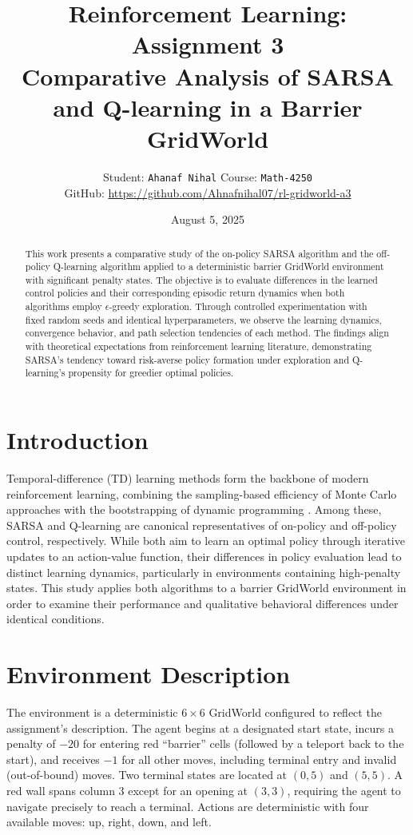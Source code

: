 \documentclass[11pt]{article}
\title{Reinforcement Learning: Assignment 3\\\large Comparative Analysis of SARSA and Q-learning in a Barrier GridWorld}
\author{Student: \texttt{Ahanaf Nihal} \quad Course: \texttt{Math-4250}\\
\small GitHub: \href{<REPO_LINK>}{ https://github.com/Ahnafnihal07/rl-gridworld-a3}}
\date{August 5, 2025}
\begin{document}
\maketitle

\begin{abstract}
This work presents a comparative study of the on-policy SARSA algorithm and the off-policy Q-learning algorithm applied to a deterministic barrier GridWorld environment with significant penalty states. 
The objective is to evaluate differences in the learned control policies and their corresponding episodic return dynamics when both algorithms employ $\epsilon$-greedy exploration.
Through controlled experimentation with fixed random seeds and identical hyperparameters, we observe the learning dynamics, convergence behavior, and path selection tendencies of each method.
The findings align with theoretical expectations from reinforcement learning literature, demonstrating SARSA's tendency toward risk-averse policy formation under exploration and Q-learning's propensity for greedier optimal policies.
\end{abstract}

\section{Introduction}
Temporal-difference (TD) learning methods form the backbone of modern reinforcement learning, combining the sampling-based efficiency of Monte Carlo approaches with the bootstrapping of dynamic programming \cite{sutton2018reinforcement}.
Among these, SARSA and Q-learning are canonical representatives of on-policy and off-policy control, respectively.
While both aim to learn an optimal policy through iterative updates to an action-value function, their differences in policy evaluation lead to distinct learning dynamics, particularly in environments containing high-penalty states.
This study applies both algorithms to a barrier GridWorld environment in order to examine their performance and qualitative behavioral differences under identical conditions.

\section{Environment Description}
The environment is a deterministic $6\times6$ GridWorld configured to reflect the assignment's description.
The agent begins at a designated start state, incurs a penalty of $-20$ for entering red ``barrier'' cells (followed by a teleport back to the start), and receives $-1$ for all other moves, including terminal entry and invalid (out-of-bound) moves.
Two terminal states are located at $(0,5)$ and $(5,5)$.
A red wall spans column $3$ except for an opening at $(3,3)$, requiring the agent to navigate precisely to reach a terminal.
Actions are deterministic with four available moves: up, right, down, and left.
\end{document}
